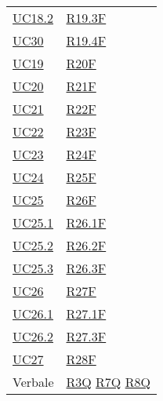 \begin{center}
\begin{longtable}[!h]{m{50px} m{50px}}
        \hyperref[sec:UC18.2]{UC18.2}     & \hyperref[tab:RequisitiFunzionali]{R19.3F} \\
        \hyperref[sec:UC30]{UC30}         & \hyperref[tab:RequisitiFunzionali]{R19.4F} \\
        \hyperref[sec:UC19]{UC19}         & \hyperref[tab:RequisitiFunzionali]{R20F}   \\
        \hyperref[sec:UC20]{UC20}         & \hyperref[tab:RequisitiFunzionali]{R21F}   \\
        \hyperref[sec:UC21]{UC21}         & \hyperref[tab:RequisitiFunzionali]{R22F}   \\
        \hyperref[sec:UC22]{UC22}         & \hyperref[tab:RequisitiFunzionali]{R23F}   \\
        \hyperref[sec:UC23]{UC23}         & \hyperref[tab:RequisitiFunzionali]{R24F}   \\
        \hyperref[sec:UC24]{UC24}         & \hyperref[tab:RequisitiFunzionali]{R25F}   \\
        \hyperref[sec:UC25]{UC25}         & \hyperref[tab:RequisitiFunzionali]{R26F}   \\
        \hyperref[sec:UC25.1]{UC25.1}     & \hyperref[tab:RequisitiFunzionali]{R26.1F} \\
        \hyperref[sec:UC25.2]{UC25.2}     & \hyperref[tab:RequisitiFunzionali]{R26.2F} \\
        \hyperref[sec:UC25.3]{UC25.3}     & \hyperref[tab:RequisitiFunzionali]{R26.3F} \\
        \hyperref[sec:UC26]{UC26}         & \hyperref[tab:RequisitiFunzionali]{R27F}   \\
        \hyperref[sec:UC26.1]{UC26.1}     & \hyperref[tab:RequisitiFunzionali]{R27.1F} \\
        \hyperref[sec:UC26.2]{UC26.2}     & \hyperref[tab:RequisitiFunzionali]{R27.3F} \\
        \hyperref[sec:UC27]{UC27}         & \hyperref[tab:RequisitiFunzionali]{R28F}   \\

        Verbale                           & \hyperref[tab:RequisitiQualita]{R3Q}
        \newline \hyperref[tab:RequisitiQualita]{R7Q}
        \newline \hyperref[tab:RequisitiQualita]{R8Q}                                  \\
    \end{longtable}
\end{center}
